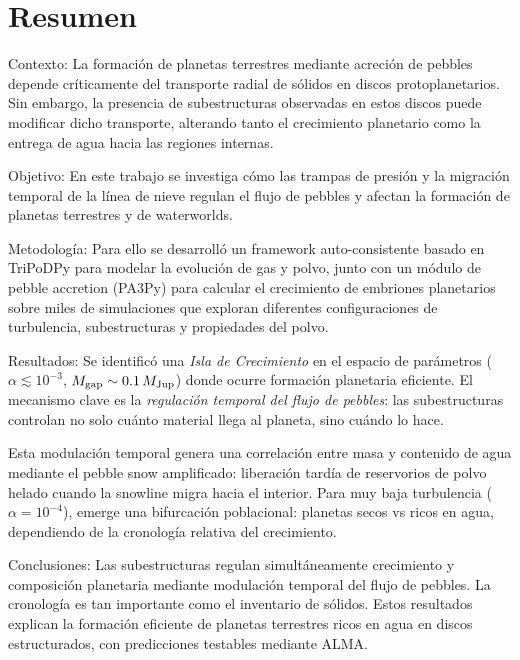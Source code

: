 \chapter*{Resumen}
Contexto: La formación de planetas terrestres mediante acreción de pebbles depende críticamente del transporte radial de sólidos en discos protoplanetarios. Sin embargo, la presencia de subestructuras observadas en estos discos puede modificar dicho transporte, alterando tanto el crecimiento planetario como la entrega de agua hacia las regiones internas.

Objetivo: En este trabajo se investiga cómo las trampas de presión y la migración temporal de la línea de nieve regulan el flujo de pebbles y afectan la formación de planetas terrestres y de waterworlds.

Metodología: Para ello se desarrolló un framework auto-consistente basado en TriPoDPy para modelar la evolución de gas y polvo, junto con un módulo de pebble accretion (PA3Py) para calcular el crecimiento de embriones planetarios sobre miles de simulaciones que exploran diferentes configuraciones de turbulencia, subestructuras y propiedades del polvo.

Resultados: Se identificó una \textit{Isla de Crecimiento} en el espacio 
de parámetros ($\alpha \lesssim 10^{-3}$, $M_{\rm gap} \sim 0.1\,M_{\rm Jup}$) 
donde ocurre formación planetaria eficiente. El mecanismo clave es la 
\textit{regulación temporal del flujo de pebbles}: las subestructuras 
controlan no solo cuánto material llega al planeta, sino cuándo lo hace.

Esta modulación temporal genera una correlación entre masa y contenido 
de agua mediante el pebble snow amplificado: liberación tardía de 
reservorios de polvo helado cuando la snowline migra hacia el interior. 
Para muy baja turbulencia ($\alpha = 10^{-4}$), emerge una bifurcación 
poblacional: planetas secos vs ricos en agua, dependiendo de la 
cronología relativa del crecimiento.

Conclusiones: Las subestructuras regulan simultáneamente crecimiento 
y composición planetaria mediante modulación temporal del flujo de 
pebbles. La cronología es tan importante como el inventario de sólidos. 
Estos resultados explican la formación eficiente de planetas terrestres 
ricos en agua en discos estructurados, con predicciones testables 
mediante ALMA.